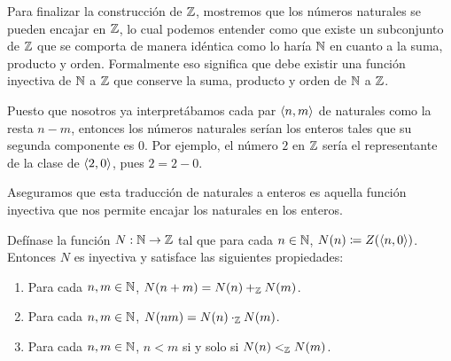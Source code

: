 Para finalizar la construcción de $\ZZ$, mostremos que los números naturales se pueden encajar en $\ZZ$, lo cual podemos entender como que existe un subconjunto de $\ZZ$ que se comporta de manera idéntica como lo haría $\NN$ en cuanto a la suma, producto y orden. Formalmente eso significa que debe existir una función inyectiva de $\NN$ a $\ZZ$ que conserve la suma, producto y orden de $\NN$ a $\ZZ$.

Puesto que nosotros ya interpretábamos cada par $\inner*{n, m}$ de naturales como la resta $n - m$, entonces los números naturales serían los enteros tales que su segunda componente es $0$. Por ejemplo, el número $2$ en $\ZZ$ sería el representante de la clase de $\inner*{2, 0}$, pues $2 = 2 - 0$.

Aseguramos que esta traducción de naturales a enteros es aquella función inyectiva que nos permite encajar los naturales en los enteros.

\begin{theorem}[Encaje de $\NN$ en $\ZZ$]
	Defínase la función $N:\NN\to\ZZ$ tal que para cada $n\in\NN$, $N\pa*{n}\coloneqq Z\pa*{\inner*{n, 0}}$. Entonces $N$ es inyectiva y satisface las siguientes propiedades:

	\begin{enumerate}
		\item Para cada $n, m\in\NN$, $N\pa*{n + m} = N\pa*{n} +_{\ZZ} N\pa*{m}$.
		\item Para cada $n, m\in\NN$, $N\pa*{nm} = N\pa*{n}\cdot_{\ZZ} N\pa*{m}$.
		\item Para cada $n, m\in\NN$, $n < m$ si y solo si $N\pa*{n} <_{\ZZ} N\pa*{m}$.
	\end{enumerate}
\end{theorem}

